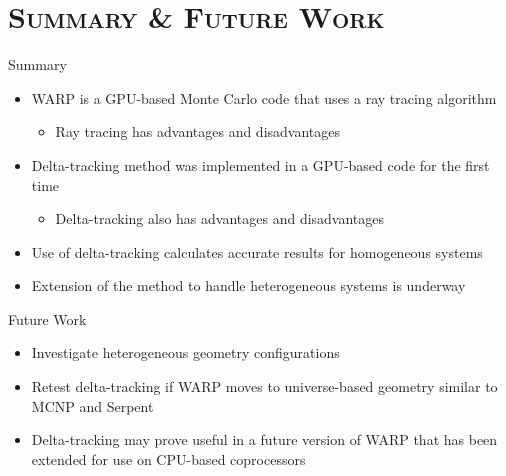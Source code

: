 \documentclass[xcolor=x11names,compress, handout]{beamer}
\renewcommand{\(}{\begin{columns}}
\renewcommand{\)}{\end{columns}}
\newcommand{\<}[1]{\begin{column}{#1}}
\renewcommand{\>}{\end{column}}
\begin{document}
\section{\scshape Summary \& Future Work}
\begin{frame}{Summary}
	\begin{itemize}
	\pause
	\item{WARP is a GPU-based Monte Carlo code that uses a ray tracing algorithm}
		\begin{itemize}
		\pause
		\item{Ray tracing has advantages and disadvantages}
		\end{itemize}
	\pause
	\item{Delta-tracking method was implemented in a GPU-based code for the first time}
		\begin{itemize}
		\pause
		\item{Delta-tracking also has advantages and disadvantages}
		\end{itemize}
	\pause
	\item{Use of delta-tracking calculates accurate results for homogeneous systems}
	\pause
	\item{Extension of the method to handle heterogeneous systems is underway}
	\end{itemize}
\end{frame}


\begin{frame}{Future Work}
	\begin{itemize}
	\pause
	\item{Investigate heterogeneous geometry configurations}
	\pause
	\item{Retest delta-tracking if WARP moves to universe-based geometry similar to MCNP and Serpent}
	\pause
	\item{Delta-tracking may prove useful in a future version of WARP that has been extended for use 
	on CPU-based coprocessors}
	\end{itemize}
\end{frame}
\end{document}
